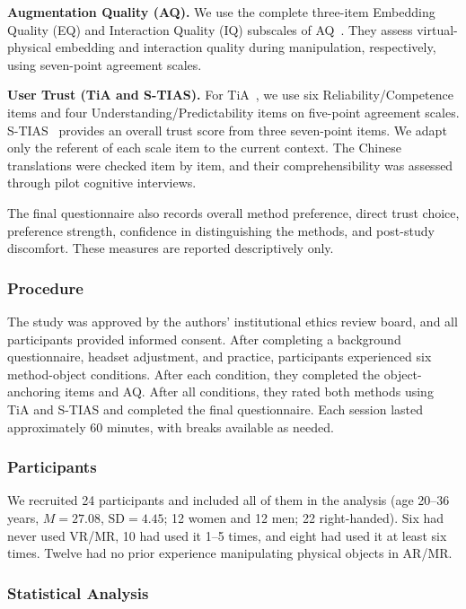 \documentclass[review]{vgtc}
\begin{document}
\textbf{Augmentation Quality (AQ).}
We use the complete three-item Embedding Quality (EQ) and Interaction Quality (IQ) subscales of AQ~\cite{aq2026}. They assess virtual-physical embedding and interaction quality during manipulation, respectively, using seven-point agreement scales.

\textbf{User Trust (TiA and S-TIAS).}
For TiA~\cite{tia2019}, we use six Reliability/Competence items and four Understanding/Predictability items on five-point agreement scales. S-TIAS~\cite{stias2025} provides an overall trust score from three seven-point items. We adapt only the referent of each scale item to the current context. The Chinese translations were checked item by item, and their comprehensibility was assessed through pilot cognitive interviews.

The final questionnaire also records overall method preference, direct trust choice, preference strength, confidence in distinguishing the methods, and post-study discomfort. These measures are reported descriptively only.

\subsubsection{Procedure}

The study was approved by the authors' institutional ethics review board, and all participants provided informed consent. After completing a background questionnaire, headset adjustment, and practice, participants experienced six method-object conditions. After each condition, they completed the object-anchoring items and AQ. After all conditions, they rated both methods using TiA and S-TIAS and completed the final questionnaire. Each session lasted approximately 60 minutes, with breaks available as needed.

\subsubsection{Participants}

We recruited 24 participants and included all of them in the analysis (age 20--36 years, $M=27.08$, $\mathrm{SD}=4.45$; 12 women and 12 men; 22 right-handed). Six had never used VR/MR, 10 had used it 1--5 times, and eight had used it at least six times. Twelve had no prior experience manipulating physical objects in AR/MR.

\subsubsection{Statistical Analysis}
\end{document}
